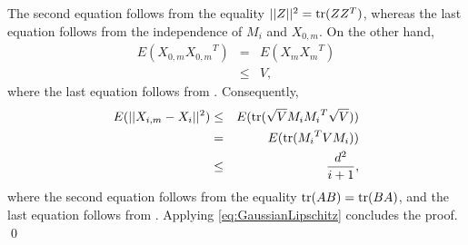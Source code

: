 \documentclass[a4paper,11pt]{article}
\begin{document}
The second equation follows from the equality \(||Z||^{2}={\rm tr}(ZZ^{T})\),  whereas the last equation follows from the independence of \(M_{i}\) and \(X_{0,m}\). On the other hand, \begin{eqnarray*}E(X_{0,m}{X_{0,m}}^{T})&=&E(X_m{X_{m}}^{T})\\&\le&V,\end{eqnarray*}
where the last equation follows from \cite[Lemma 2]{kahaleGaussian2019}. Consequently,
\begin{eqnarray*}
E(||X_{i,m}-X_{i}||^{2})
&\le&E({\rm tr}(\sqrt{V}M_{i}{M_{i}}^{T}\sqrt{V}))\\
&=&E({\rm tr}({M_{i}}^{T}VM_{i}))\\
&\le&\frac{d^{2}}{i+1},
\end{eqnarray*}
where the second equation follows from the equality \({\rm tr}(AB)={\rm tr}(BA)\), and the last equation follows from \cite[Theorem 1]{kahaleGaussian2019}.  Applying \eqref{eq:GaussianLipschitz} concludes the proof. 
\qed

\end{document}
